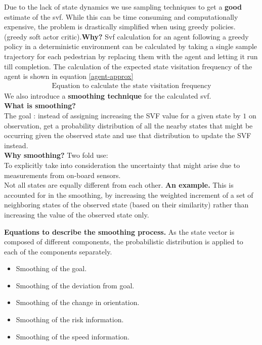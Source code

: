Due to the lack of state dynamics we use sampling techniques to get a \textbf{good} estimate of the svf. While this can be time consuming and computationally expensive, the problem is drastically simplified when using greedy policies. (greedy soft actor critic).\textbf{Why?} 
Svf calculation for an agent following a greedy policy in a deterministic environment can be calculated by taking a single sample trajectory for each pedestrian by replacing them with the agent and letting it run till completion. The calculation of the expected state visitation frequency of the agent is shown in equation \ref{agent-approx}
\begin{align}
\label{agent-approx}
\text{Equation to calculate the state visitation frequency}
\end{align}
We also introduce a \textbf{smoothing technique} for the calculated svf. \\
\textbf{What is smoothing?}\\
 The goal : instead of assigning increasing the SVF value for a given state by $1$ on observation, get a probability distribution of all the nearby states that might be occurring given the observed state and use that distribution to update the SVF instead.\\
 \textbf{Why smoothing?}
 Two fold use:\\
 To explicitly take into consideration the uncertainty that might arise due to measurements from on-board sensors.\\
 Not all states are equally different from each other. \textbf{An example.} This is accounted for in the smoothing, by increasing the weighted increment of a set of neighboring states of the observed state (based on their similarity) rather than increasing the value of the observed state only.  
  
\textbf{Equations to describe the smoothing process.}
As the state vector is composed of different components, the probabilistic distribution is applied to each of the components separately.
\begin{itemize}
	\item Smoothing of the goal.
	\item Smoothing of the deviation from goal.
	\item Smoothing of the change in orientation.
	\item Smoothing of the risk information.
	\item Smoothing of the speed information.
\end{itemize}


